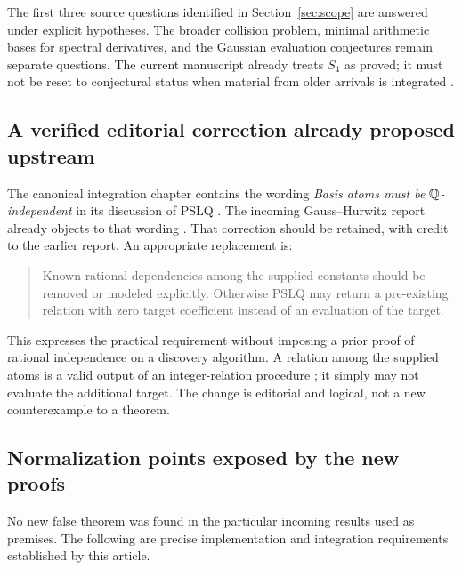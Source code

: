 The first three source questions identified in Section~\ref{sec:scope}
are answered under explicit hypotheses. The broader collision problem,
minimal arithmetic bases for spectral derivatives, and the Gaussian
evaluation conjectures remain separate questions. The current manuscript
already treats $S_4$ as proved; it must not be reset to conjectural status
when material from older arrivals is integrated \cite{repo}.

\subsection{A verified editorial correction already proposed upstream}
The canonical integration chapter contains the wording
\emph{Basis atoms must be $\mathbb Q$-independent} in its discussion of PSLQ
\cite[chapters/07-integration.tex]{repo}. The incoming Gauss--Hurwitz
report already objects to that wording \cite[Section 8]{incoming-gh}.
That correction should be retained, with credit to the earlier report.
An appropriate replacement is:
\begin{quote}
Known rational dependencies among the supplied constants should be
removed or modeled explicitly. Otherwise PSLQ may return a pre-existing
relation with zero target coefficient instead of an evaluation of the
target.
\end{quote}
This expresses the practical requirement without imposing a prior proof
of rational independence on a discovery algorithm. A relation among
the supplied atoms is a valid output of an integer-relation procedure
\cite{pslq};
it simply may not evaluate the additional target. The change is
editorial and logical, not a new counterexample to a theorem.

\subsection{Normalization points exposed by the new proofs}
No new false theorem was found in the particular incoming results used
as premises. The following are precise implementation and integration
requirements established by this article.

